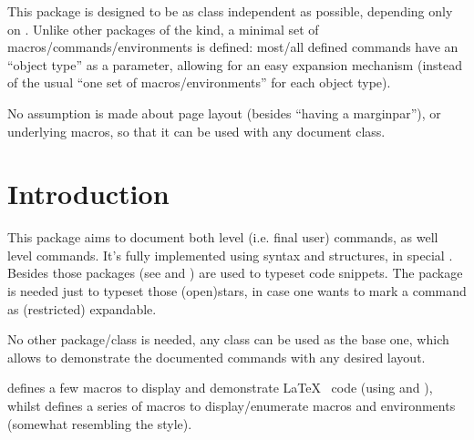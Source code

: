 \documentclass{article}
\begin{document}

  
\begin{typesetabstract}

This package is designed to be as class independent as possible, depending only on . Unlike other packages of the kind, a minimal set of macros/commands/environments is defined: most/all defined commands have an ``object type'' as a  parameter, allowing for an easy expansion mechanism (instead of the usual ``one set of macros/environments'' for each object type).

No assumption is made about page layout (besides ``having a marginpar''),  or underlying macros, so that it can be used with any document class.

\end{typesetabstract}

\tableofcontents

\section{Introduction}


This package aims to document both  level (i.e. final user) commands, as well  level commands. It's fully implemented using  syntax and structures, in special . Besides those  packages (see \cite{SCONTENTS} and \cite{listings}) are used to typeset code snippets. The package  is needed just to typeset those (open)stars, in case one wants to mark a command as (restricted) expandable.
 
 
No other package/class is needed, any class can be used as the base one, which allows to demonstrate the documented commands with any desired layout.

 defines a few macros to display and demonstrate \LaTeX~ code (using  and ), whilst  defines a series of macros to display/enumerate macros and environments (somewhat resembling the  style).
\end{document}
